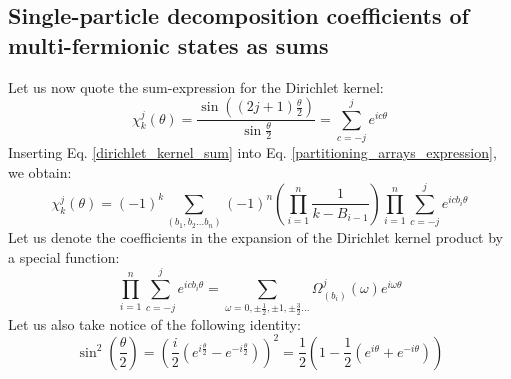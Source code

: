 \documentclass[12pt]{article}
\begin{document}
	\subsection{Single-particle decomposition coefficients of multi-fermionic states as sums}
	Let us now quote the sum-expression for the Dirichlet kernel:
	\begin{equation} \label{dirichlet_kernel_sum}
	\chi^j_k(\theta)=\frac{\sin((2j+1)\frac{\theta}{2})}{\sin{\frac{\theta}{2}}}=\sum_{c=-j}^j e^{ic\theta}
	\end{equation}
	Inserting Eq. \ref{dirichlet_kernel_sum} into Eq. \ref{partitioning_arrays_expression}, we obtain:
	\begin{equation}
	\chi^j_k(\theta) = (-1)^k\sum_{(b_1, b_2\dots b_n)}(-1)^n\left(\prod_{i=1}^n \frac{1}{k-B_{i-1}}\right)\prod_{i=1}^n \sum_{c=-j}^j e^{icb_i\theta}
	\end{equation}
	Let us denote the coefficients in the expansion of the Dirichlet kernel product by a special function:
	\begin{equation} \label{omega_distribution_decomposition}
	\prod_{i=1}^n \sum_{c=-j}^j e^{icb_i\theta}=\sum_{\omega=0,\pm\frac{1}{2},\pm 1,\pm\frac{3}{2}\dots}\Omega^j_{(b_i)}(\omega)e^{i\omega\theta}
	\end{equation}
	Let us also take notice of the following identity:
	\begin{equation}
	\sin^2(\frac{\theta}{2})=\left(\frac{i}{2}\left(e^{i\frac{\theta}{2}}-e^{-i\frac{\theta}{2}}\right)\right)^2=\frac{1}{2}\left(1-\frac{1}{2}\left(e^{i\theta}+e^{-i\theta}\right)\right)
	\end{equation}
	
\end{document}
